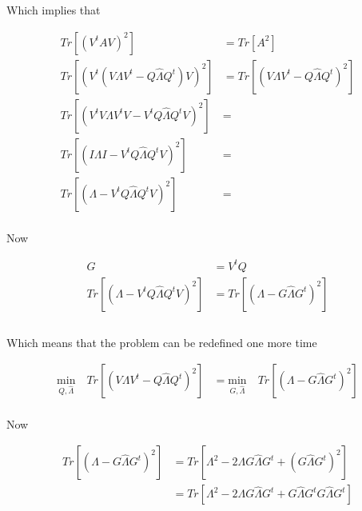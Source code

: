 \documentclass[12pt,journal]{IEEEtran}
\begin{document}
    Which implies that

    \begin{equation*}
        \begin{aligned}
            Tr[(V^tAV)^2] &= Tr[A^2]\\
            Tr[(V^t(V\Lambda V^t - Q \hat{\Lambda} Q^t)V)^2] &= Tr[(V\Lambda V^t - Q \hat{\Lambda} Q^t)^2]\\
            Tr[(V^tV\Lambda V^tV - V^tQ \hat{\Lambda} Q^tV)^2] &=\\
            Tr[(I\Lambda I - V^tQ \hat{\Lambda} Q^tV)^2] &=\\
            Tr[(\Lambda - V^tQ \hat{\Lambda} Q^tV)^2] &=\\
        \end{aligned}
    \end{equation*}

    Now

    \begin{equation*}
        \begin{aligned}
            G &= V^tQ\\
            Tr[(\Lambda - V^tQ \hat{\Lambda} Q^tV)^2] &= Tr[(\Lambda - G \hat{\Lambda} G^t)^2]\\
        \end{aligned}
    \end{equation*}\\

    Which means that the problem can be redefined one more time

    \begin{equation*}
        \begin{aligned}
        \underset{Q,\hat{\Lambda}}{\text{min}} \quad Tr[(V\Lambda V^t - Q \hat{\Lambda} Q^t)^2]
        &=
        \underset{G,\hat{\Lambda}}{\text{min}} \quad Tr[(\Lambda - G \hat{\Lambda} G^t)^2]
        \end{aligned}
    \end{equation*}\\

    Now

    \begin{equation*}
        \begin{aligned}
        Tr[(\Lambda - G \hat{\Lambda} G^t)^2]
        &=
        Tr[\Lambda^2 - 2 \Lambda G \hat{\Lambda} G^t + (G \hat{\Lambda} G^t)^2]\\
        &=
        Tr[\Lambda^2 - 2 \Lambda G \hat{\Lambda} G^t + G \hat{\Lambda} G^t G \hat{\Lambda} G^t]\\
        \end{aligned}
    \end{equation*}
\end{document}
